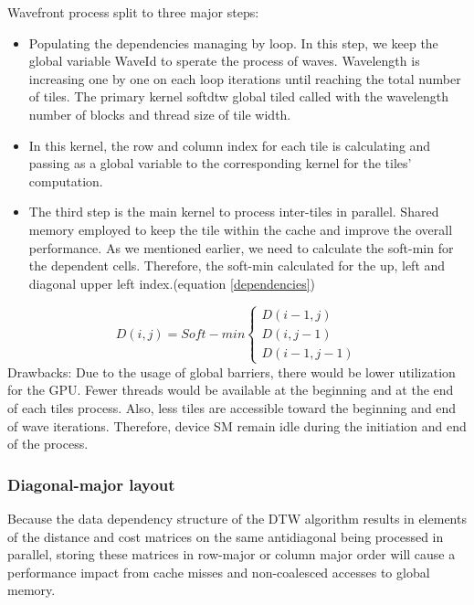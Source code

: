 \documentclass[12pt, letterpaper]{article}
\begin{document}
Wavefront process split to three major steps:

\begin{itemize}
  \item Populating the dependencies managing by loop. In this step, we keep the global variable WaveId to sperate the process of waves. Wavelength is increasing one by one on each loop iterations until reaching the total number of tiles. The primary kernel softdtw global tiled called with the wavelength number of blocks and thread size of tile width.
  \item In this kernel, the row and column index for each tile is calculating and passing as a global variable to the corresponding kernel for the tiles’ computation.
  \item The third step is the main kernel to process inter-tiles in parallel. Shared memory employed to keep the tile within the cache and improve the overall performance. As we mentioned earlier, we need to calculate the soft-min for the dependent cells. Therefore, the soft-min calculated for the up, left and diagonal upper left index.(equation \ref{dependencies})
\end{itemize}

\begin{equation} \label{dependencies}
  D (i,j) = Soft-min
  \begin{cases}
        D(i-1,j) \\
        D(i,j-1)\\
        D(i-1,j-1)
  \end{cases}
\end{equation}
Drawbacks:
Due to the usage of global barriers, there would be lower utilization for the GPU. 
Fewer threads would be available at the beginning and at the end of each tiles process. 
Also, less tiles are accessible toward the beginning and end of wave iterations. 
Therefore, device SM remain idle during the initiation and end of the process. 

\subsubsection{Diagonal-major layout}

Because the data dependency structure of the DTW algorithm results in elements
of the distance and cost matrices on the same antidiagonal being processed in
parallel, storing these matrices in row-major or column major order will cause a
performance impact from cache misses and non-coalesced accesses to global
memory.
\end{document}
